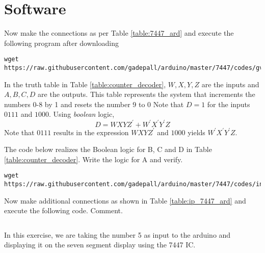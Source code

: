 \documentclass[journal,12pt,twocolumn]{IEEEtran}
\begin{document}
\section{Software}
\begin{problem}
Now make the connections as per Table \ref{table:7447_ard}  and execute the following program after downloading
\begin{lstlisting}
wget https://raw.githubusercontent.com/gadepall/arduino/master/7447/codes/gvv_ard_7447/gvv_ard_7447.ino
\end{lstlisting}
\end{problem}
\begin{table}[!h]
\centering

\caption{}
\label{table:7447_ard}
\end{table}
In the  truth table in Table \ref{table:counter_decoder},  $W,X,Y,Z$ are the inputs
and $A,B,C,D$ are the outputs. This table represents the system that increments the numbers 0-8 by 1 and resets the number 9 to 0
%
Note that  $D = 1$ for the inputs $0111$ and $1000$.  Using {\em boolean} logic,
%
\begin{equation}
\label{bool_logic}
D = WXYZ^{'} + W^{'}X^{'}Y^{'}Z
\end{equation}
%
Note that $0111$ results in the expression $WXYZ^{'}$ and $1000$ yields $W^{'}X^{'}Y^{'}Z$. 
%
\begin{problem}
The code below realizes the Boolean logic for B, C and D in  Table \ref{table:counter_decoder}.  Write the logic for A and verify.
\begin{lstlisting}
wget https://raw.githubusercontent.com/gadepall/arduino/master/7447/codes/inc_dec/inc_dec.ino
\end{lstlisting}
 \end{problem}

\begin{problem}
Now make additional connections as shown in Table \ref{table:ip_7447_ard} and execute the following code.  Comment.
\begin{lstlisting}
\end{lstlisting}
\end{problem}
\solution
In this exercise, we are taking the number 5 as input to the arduino and displaying it on the seven segment display using the 7447 IC.
\begin{table}[!h]
\centering

\caption{}
\label{table:ip_7447_ard}
\end{table}
\end{document}
